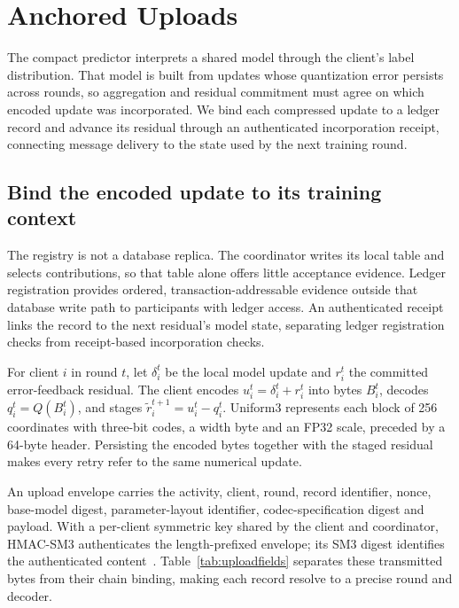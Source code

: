 \section{Anchored Uploads}\label{sec:anchored}
The compact predictor interprets a shared model through the client's label distribution. That model is built from updates whose quantization error persists across rounds, so aggregation and residual commitment must agree on which encoded update was incorporated. We bind each compressed update to a ledger record and advance its residual through an authenticated incorporation receipt, connecting message delivery to the state used by the next training round.

\subsection{Bind the encoded update to its training context}
The registry is not a database replica. The coordinator writes its local table and selects contributions, so that table alone offers little acceptance evidence. Ledger registration provides ordered, transaction-addressable evidence outside that database write path to participants with ledger access. An authenticated receipt links the record to the next residual's model state, separating ledger registration checks from receipt-based incorporation checks.

For client $i$ in round $t$, let $\delta_i^t$ be the local model update and $r_i^t$ the committed error-feedback residual. The client encodes $u_i^t=\delta_i^t+r_i^t$ into bytes $B_i^t$, decodes $q_i^t=Q(B_i^t)$, and stages $\widetilde r_i^{t+1}=u_i^t-q_i^t$. Uniform3 represents each block of 256 coordinates with three-bit codes, a width byte and an FP32 scale, preceded by a 64-byte header. Persisting the encoded bytes together with the staged residual makes every retry refer to the same numerical update.

An upload envelope carries the activity, client, round, record identifier, nonce, base-model digest, parameter-layout identifier, codec-specification digest and payload. With a per-client symmetric key shared by the client and coordinator, HMAC-SM3 authenticates the length-prefixed envelope; its SM3 digest identifies the authenticated content~\cite{rfc2104,shen2018sm3}. Table~\ref{tab:uploadfields} separates these transmitted bytes from their chain binding, making each record resolve to a precise round and decoder.



